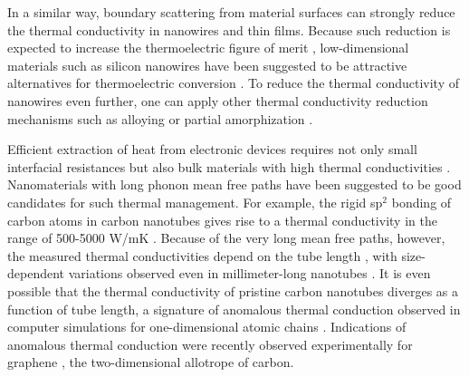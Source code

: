 In a similar way, boundary scattering from material surfaces can strongly reduce the thermal conductivity in nanowires and thin films. Because such reduction is expected to increase the thermoelectric figure of merit \cite{chen}, low-dimensional materials such as silicon nanowires have been suggested to be attractive alternatives for thermoelectric conversion \cite{hochbaum08}. To reduce the thermal conductivity of nanowires even further, one can apply other thermal conductivity reduction mechanisms such as alloying \cite{} or partial amorphization \cite{}. %

Efficient extraction of heat from electronic devices requires not only small interfacial resistances but also bulk materials with high thermal conductivities \cite{pop10}. Nanomaterials with long phonon mean free paths have been suggested to be good candidates for such thermal management. For example, the rigid sp$^2$ bonding of carbon atoms in carbon nanotubes \cite{iijima91} gives rise to a thermal conductivity in the range of 500-5000 W/mK \cite{}. Because of the very long mean free paths, however, the measured thermal conductivities depend on the tube length \cite{chang08}, with size-dependent variations observed even in millimeter-long nanotubes \cite{chang_personal}. It is even possible that the thermal conductivity of pristine carbon nanotubes diverges as a function of tube length, a signature of anomalous thermal conduction observed in computer simulations for one-dimensional atomic chains \cite{lepri03,mai07,dhar08}. Indications of anomalous thermal conduction were recently observed experimentally \cite{xu14} for graphene \cite{}, the two-dimensional allotrope of carbon.


